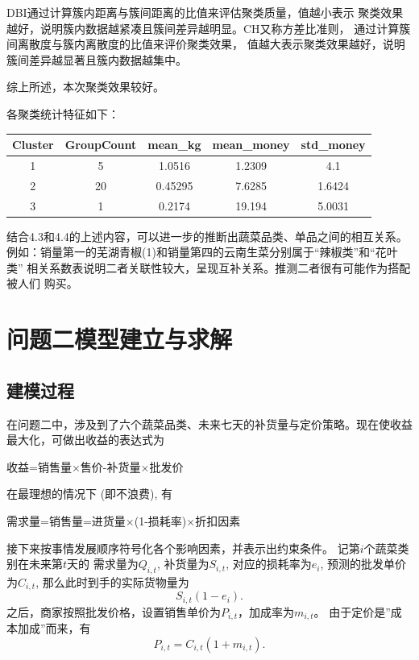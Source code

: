 \documentclass{cumcmthesis}
\begin{document}
DBI通过计算簇内距离与簇间距离的比值来评估聚类质量，值越小表示
聚类效果越好，说明簇内数据越紧凑且簇间差异越明显。CH又称方差比准则，
通过计算簇间离散度与簇内离散度的比值来评价聚类效果，
值越大表示聚类效果越好，说明簇间差异越显著且簇内数据越集中。

综上所述，本次聚类效果较好。

各聚类统计特征如下：

\begin{table}[H]
    \centering
    \begin{tabular}{c c c c c}
    \toprule
    Cluster & GroupCount & mean\_kg & mean\_money & std\_money \\
    \midrule
    1 & 5 & 1.0516 & 1.2309 & 4.1 \\
    2 & 20 & 0.45295 & 7.6285 & 1.6424 \\
    3 & 1 & 0.2174 & 19.194 & 5.0031 \\
    \bottomrule
    \end{tabular}
\end{table}

结合4.3和4.4的上述内容，可以进一步的推断出蔬菜品类、单品之间的相互关系。
例如：销量第一的芜湖青椒(1)和销量第四的云南生菜分别属于“辣椒类”和“花叶类”
相关系数表说明二者关联性较大，呈现互补关系。推测二者很有可能作为搭配被人们
购买。
\section{问题二模型建立与求解}%

\subsection{建模过程}
在问题二中，涉及到了六个蔬菜品类、未来七天的补货量与定价策略。现在使收益最大化，可做出收益的表达式为

\begin{center}     
收益=销售量$\times$售价-补货量$\times$批发价
\end{center}

在最理想的情况下 (即不浪费), 有

\begin{center}  
需求量=销售量=进货量$\times$(1-损耗率)$\times$折扣因素
\end{center}   



接下来按事情发展顺序符号化各个影响因素，并表示出约束条件。
记第$i$个蔬菜类别在未来第$t$天的
需求量为$Q_{i,t}$, 
补货量为$S_{i,t}$, 
对应的损耗率为$e_i$, 
预测的批发单价为$C_{i,t}$, 
那么此时到手的实际货物量为
\[
S_{i,t}(1-e_i).
\]
之后，商家按照批发价格，设置销售单价为$P_{i,t}$，加成率为$m_{i,t}$。
由于定价是''成本加成''而来，有
\[
P_{i,t}=C_{i,t}(1+m_{i,t}).
\]
\end{document}
